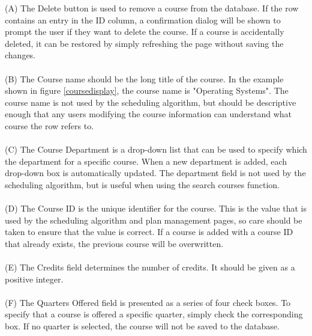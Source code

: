 \documentclass[]{article}
\begin{document}
		(A) The Delete button is used to remove a course from the database. If the row contains an entry in the ID column, a confirmation dialog will be shown to prompt the user if they want to delete the course. If a course is accidentally deleted, it can be restored by simply refreshing the page without saving the changes. \\~\\
		
		(B) The Course name should be the long title of the course. In the example shown in figure \ref{coursedisplay}, the course name is "Operating Systems". The course name is not used by the scheduling algorithm, but should be descriptive enough that any users modifying the course information can understand what course the row refers to.\\~\\
		
		(C) The Course Department is a drop-down list that can be used to specify which the department for a specific course. When a new department is added, each drop-down box is automatically updated. The department field is not used by the scheduling algorithm, but is useful when using the search courses function. \\~\\
		
		(D) The Course ID is the unique identifier for the course. This is the value that is used by the scheduling algorithm and plan management pages, so care should be taken to ensure that the value is correct. If a course is added with a course ID that already exists, the previous course will be overwritten. \\~\\
		
		(E) The Credits field determines the number of credits. It should be given as a positive integer. \\~\\
		
		(F) The Quarters Offered field is presented as a series of four check boxes. To specify that a course is offered a specific quarter, simply check the corresponding box. If no quarter is selected, the course will not be saved to the database.\\~\\
		
\end{document}
